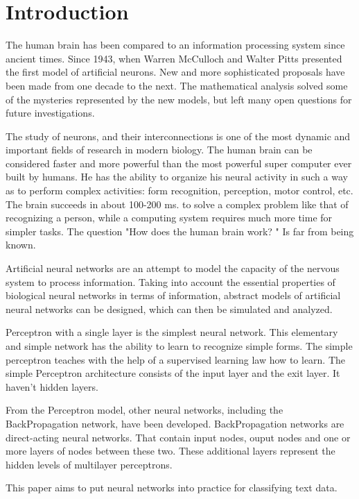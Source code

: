 \section*{Introduction}


The human brain has been compared to an information processing system since ancient times. Since 1943, when Warren McCulloch and Walter Pitts presented the first model of artificial neurons. New and more sophisticated proposals have been made from one decade to the next. The mathematical analysis solved some of the mysteries represented by the new models, but left many open questions for future investigations.

The study of neurons, and their interconnections is one of the most dynamic and important fields of research in modern biology. The human brain can be considered faster and more powerful than the most powerful super computer ever built by humans. He has the ability to organize his neural activity in such a way as to perform complex activities: form recognition, perception, motor control, etc. The brain succeeds in about 100-200 ms. to solve a complex problem like that of recognizing a person, while a computing system requires much more time for simpler tasks. The question "How does the human brain work? " Is far from being known.

Artificial neural networks are an attempt to model the capacity of the nervous system to process information. Taking into account the essential properties of biological neural networks in terms of information, abstract models of artificial neural networks can be designed, which can then be simulated and analyzed.

Perceptron with a single layer is the simplest neural network. This elementary and simple network has the ability to learn to recognize simple forms. The simple perceptron teaches with the help of a supervised learning law how to learn. The simple Perceptron architecture consists of the input layer and the exit layer. It haven't hidden layers.

From the Perceptron model, other neural networks, including the BackPropagation network, have been developed. BackPropagation networks are direct-acting neural networks. That contain input nodes, ouput nodes and one or more layers of nodes between these two. These additional layers represent the hidden levels of multilayer perceptrons.

This paper aims to put neural networks into practice for classifying text data.
 
